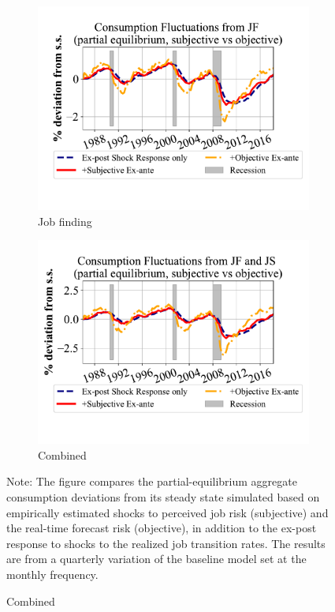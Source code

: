 \begin{figure}[ht]
\begin{subfigure}{0.32\linewidth}
    \end{subfigure}
    \hfill
    \begin{subfigure}{0.32\linewidth}
         \caption*{Job finding}
        \includegraphics[width=\linewidth]{text/chapter2/Figures/consumption_pe_JF_deviation_machine_as_rational.pdf}
   
    \end{subfigure}
    \hfill
    \begin{subfigure}{0.32\linewidth}
         \caption*{Combined}
        \includegraphics[width=\linewidth]{text/chapter2/Figures/consumption_pe_JS_JF_deviation_machine_as_rational.pdf}
   
    \end{subfigure}

    \begin{flushleft}
        \footnotesize 
        Note: The figure compares the partial-equilibrium aggregate consumption deviations from its steady state simulated based on empirically estimated shocks to perceived job risk (subjective) and the real-time forecast risk (objective), in addition to the ex-post response to shocks to the realized job transition rates. The results are from a quarterly variation of the baseline model set at the monthly frequency.
    \end{flushleft}
\end{figure}


